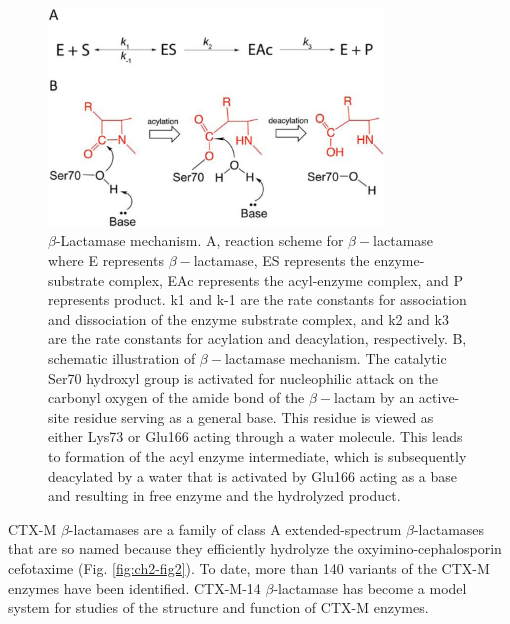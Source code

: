 \documentclass[../main.tex]{subfiles}
\begin{document}
        \begin{figure}[!htb] %
            \centering
            \includegraphics[width=3.5in]{ch2-fig1.jpg}
            \caption[$\beta$-Lactamase mechanism.]
                {$\beta$-Lactamase mechanism. A, reaction scheme for $\beta-$lactamase where E represents $\beta-$lactamase, ES represents the enzyme-substrate complex, EAc represents the acyl-enzyme complex, and P represents product. k1 and k-1 are the rate constants for association and dissociation of the enzyme substrate complex, and k2 and k3 are the rate constants for acylation and deacylation, respectively. B, schematic illustration of $\beta-$lactamase mechanism. The catalytic Ser70 hydroxyl group is activated for nucleophilic attack on the carbonyl oxygen of the amide bond of the $\beta-$lactam by an active-site residue serving as a general base. This residue is viewed as either Lys73 or Glu166 acting through a water molecule. This leads to formation of the acyl enzyme intermediate, which is subsequently deacylated by a water that is activated by Glu166 acting as a base and resulting in free enzyme and the hydrolyzed product.}
            \label{fig:ch2-fig1}
        \end{figure}

        CTX-M $\beta$-lactamases are a family of class A extended-spectrum $\beta$-lactamases that are so named because they efficiently hydrolyze the oxyimino-cephalosporin cefotaxime\cite{bonnet_growing_2004} (Fig. \ref{fig:ch2-fig2}). To date, more than 140 variants of the CTX-M enzymes have been identified\cite{dandrea_ctx-m-type_2013}. CTX-M-14 $\beta$-lactamase has become a model system for studies of the structure and function of CTX-M enzymes\cite{chen_atomic_2005,adamski_molecular_2015,patel_characterization_2015,patel_drug-resistant_2017}.
\end{document}
